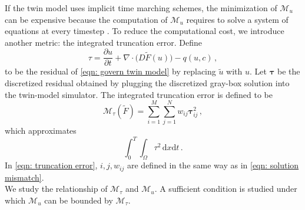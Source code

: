 If the twin model uses implicit time marching schemes,
the minimization of $\mathcal{M}_u$ can be expensive because the computation of $\mathcal{M}_u$ 
requires to solve a system of equations at every timestep \cite{PDE theory}.
To reduce the computational cost, we introduce another metric:
the integrated truncation error.
Define
\begin{equation}
    \tau = \frac{\partial u}{\partial t} 
    + \nabla \cdot \big(D \tilde{F}(u)\big) - q(u,c)\,,
    \label{eqn: residual}
\end{equation}
to be the residual of \eqref{eqn: govern twin model}
by replacing $\tilde{u}$ with $u$.
Let $\boldsymbol{\tau}$ be the discretized residual obtained by plugging the discretized 
gray-box solution into the twin-model simulator.
The integrated truncation error is defined to be
\begin{equation}
    \mathcal{M}_{\tau}(\tilde{F}) = \sum_{i=1}^M \sum_{j=1}^N w_{ij} \boldsymbol{\tau}_{ij}^2 \,,
    \label{eqn: truncation error}
\end{equation}
which approximates
\begin{equation}
    \int_0^T \int_\Omega \tau^2 \, \textrm{d}x\textrm{d}t\,.
    \label{eqn: integrated residual}
\end{equation}
In \eqref{eqn: truncation error}, 
$i, j, w_{ij}$ are defined in the same way as in \eqref{eqn: solution mismatch}.\\

We study the relationship of $\mathcal{M}_{\tau}$ and $\mathcal{M}_{u}$.
A sufficient condition is studied under which $\mathcal{M}_u$ can be bounded by 
$\mathcal{M}_{\tau}$.\\

